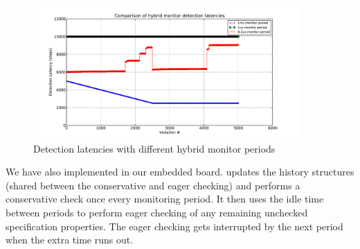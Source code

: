 \begin{figure}[t]
\centering
\includegraphics[width=4in]{img/hybrid_comp}
\caption{Detection latencies with different hybrid monitor periods\label{fig:hybrid_comp}}
\end{figure}
%
%
%
%
%
We have also implemented \ha in our embedded board.
\ha updates the history structures (shared between
the conservative and eager checking) and
performs a conservative check once every monitoring period.
It then uses the idle time between periods to perform eager
checking of any remaining unchecked specification properties.
The eager checking gets interrupted  by the next period
when the extra time runs out.


